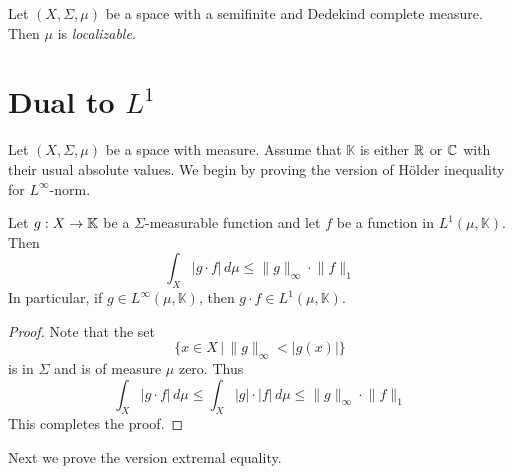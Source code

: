 \begin{definition}
  Let $(X,\Sigma,\mu)$ be a space with a semifinite and Dedekind complete measure. Then $\mu$ is \textit{localizable}.
\end{definition}


\section{Dual to $L^1$}
\noindent
Let $(X,\Sigma,\mu)$ be a space with measure. Assume that $\mathbb{K}$ is either ${\mathbb R}$ or ${\mathbb C}$ with their usual absolute values. We begin by proving the version of H{\"o}lder inequality for $L^{\infty}$-norm.

\begin{proposition}\label{proposition:L_infinity_Holder}
  Let $g:X \rightarrow \mathbb{K}$ be a $\Sigma$-measurable function and let $f$ be a function in $L^1(\mu,\mathbb{K})$. Then 
  $$\int_X |g\cdot f|\,d\mu \leq \lVert g\rVert_{\infty} \cdot \lVert f\rVert_1$$
  In particular, if $g \in L^{\infty}(\mu,\mathbb{K})$, then $g\cdot f \in L^1(\mu,\mathbb{K})$.
\end{proposition}
\begin{proof}
  Note that the set
  $$\big\{x\in X\,\big|\,\lVert g \rVert_{\infty} < |g(x)|\big\}$$
  is in $\Sigma$ and is of measure $\mu$ zero. Thus
  $$\int_X |g\cdot f|\,d\mu \leq \int_X |g| \cdot |f|\,d\mu \leq \lVert g\rVert_{\infty} \cdot \lVert f\rVert_1$$
  This completes the proof.
\end{proof}
\noindent
Next we prove the version extremal equality.

